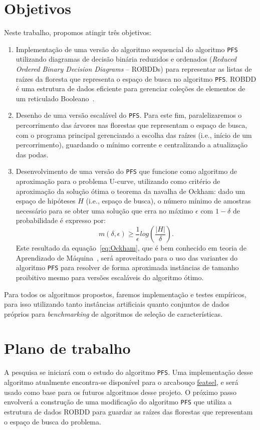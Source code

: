 \documentclass[12pt]{article}
\begin{document}
\section{Objetivos}
Neste trabalho, propomos atingir três objetivos:

\begin{enumerate}
\item Implementação de uma versão do algoritmo sequencial do algoritmo {\tt PFS} utilizando diagramas de decisão binária reduzidos e ordenados ({\em Reduced Ordered Binary Decision Diagrams} -- ROBDDs) para representar as listas de raízes da floresta que representa o espaço de busca no algoritmo {\tt PFS}. ROBDD é uma estrutura de dados eficiente para gerenciar coleções de elementos de um reticulado Booleano~\cite{bryant}.

\item Desenho de uma versão escalável do {\tt PFS}. Para este fim, paralelizaremos o percorrimento das
árvores nas florestas que representam o espaço de busca, com o programa
principal gerenciando a escolha das raízes (i.e., início de um 
percorrimento), guardando o mínimo corrente e centralizando a
atualização das podas.

\item Desenvolvimento de uma versão do {\tt PFS} que funcione como algoritmo 
de aproximação para o problema U-curve, utilizando como critério de
aproximação da solução ótima o teorema da navalha de Ockham: dado um espaço de hipóteses $H$ (i.e., espaço de busca), o número mínimo 
de amostras necessário para se obter uma solução que erra no máximo 
$\epsilon$ com $1 - \delta$ de probabilidade é expresso por:
\begin{equation}
\displaystyle  m(\delta,\epsilon) \ge 
    \frac{1}{\epsilon} log (\frac{|H|}{\delta}). \label{eq:Ockham}
\end{equation}
Este resultado da equação~\ref{eq:Ockham}, que é bem conhecido em teoria de Aprendizado de Máquina~\cite{kearns}, será aproveitado para o uso das variantes do algoritmo {\tt PFS} para resolver de forma aproximada instâncias de tamanho proibitivo mesmo para versões escaláveis do algoritmo ótimo.
\end{enumerate}

Para todos os algoritmos propostos, faremos implementação e testes empíricos, para isso utilizando tanto instâncias artificiais quanto conjuntos de dados próprios para {\em benchmarking} de algoritmos de seleção de características.


\section{Plano de trabalho}
A pesquisa se iniciará com o estudo do algoritmo {\tt PFS}. Uma implementação desse algoritmo atualmente encontra-se disponível para o  
arcabouço \href{https://github.com/msreis/featsel}{featsel}, e será 
usado como base para os futuros algoritmos desse projeto. O próximo 
passo envolverá a construção de uma modificação do algoritmo {\tt PFS}
que utiliza a estrutura de dados ROBDD para guardar as raízes das 
florestas que representam o espaço de busca do problema.
\end{document}
